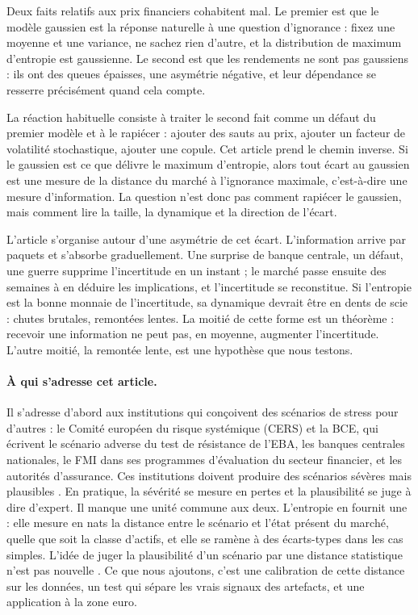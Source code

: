 \documentclass[11pt]{article}
\theoremstyle{definition}
\begin{document}
Deux faits relatifs aux prix financiers cohabitent mal. Le premier est que le
modèle gaussien est la réponse naturelle à une question d'ignorance : fixez une
moyenne et une variance, ne sachez rien d'autre, et la distribution de maximum
d'entropie est gaussienne. Le second est que les rendements ne sont pas
gaussiens : ils ont des queues épaisses, une asymétrie négative, et leur
dépendance se resserre précisément quand cela compte.

La réaction habituelle consiste à traiter le second fait comme un défaut du
premier modèle et à le rapiécer : ajouter des sauts au prix, ajouter un facteur
de volatilité stochastique, ajouter une copule. Cet article prend le chemin
inverse. Si le gaussien est ce que délivre le maximum d'entropie, alors tout
écart au gaussien est une mesure de la distance du marché à l'ignorance
maximale, c'est-à-dire une mesure d'information. La question n'est donc pas
comment rapiécer le gaussien, mais comment lire la taille, la dynamique et la
direction de l'écart.

L'article s'organise autour d'une asymétrie de cet écart. L'information arrive
par paquets et s'absorbe graduellement. Une surprise de banque centrale, un
défaut, une guerre supprime l'incertitude en un instant ; le marché passe ensuite
des semaines à en déduire les implications, et l'incertitude se reconstitue. Si
l'entropie est la bonne monnaie de l'incertitude, sa dynamique devrait être en
dents de scie : chutes brutales, remontées lentes. La moitié de cette forme est
un théorème : recevoir une information ne peut pas, en moyenne, augmenter
l'incertitude. L'autre moitié, la remontée lente, est une hypothèse que nous
testons.

\paragraph{À qui s'adresse cet article.} Il s'adresse d'abord aux
institutions qui conçoivent des scénarios de stress pour d'autres : le Comité
européen du risque systémique (CERS) et la BCE, qui écrivent le scénario
adverse du test de résistance de l'EBA, les banques centrales nationales, le
FMI dans ses programmes d'évaluation du secteur financier, et les autorités
d'assurance. Ces institutions doivent produire des scénarios \og sévères mais
plausibles \fg{} \citep{bcbs2018}. En pratique, la sévérité se mesure en
pertes et la plausibilité se juge à dire d'expert. Il manque une unité commune
aux deux. L'entropie en fournit une : elle mesure en nats la distance entre le
scénario et l'état présent du marché, quelle que soit la classe d'actifs, et
elle se ramène à des écarts-types dans les cas simples. L'idée de juger la
plausibilité d'un scénario par une distance statistique n'est pas nouvelle
\citep{breuer2009,breuer2013,glasserman2014}. Ce que nous ajoutons, c'est une
calibration de cette distance sur les données, un test qui sépare les vrais
signaux des artefacts, et une application à la zone euro.
\end{document}
